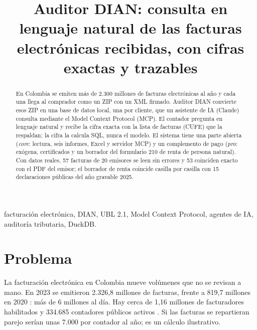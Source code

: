 \documentclass[conference,a4paper]{IEEEtran}
\begin{document}
\title{Auditor DIAN: consulta en lenguaje natural de las facturas electrónicas recibidas, con cifras exactas y trazables}

\author{
}

\maketitle

\begin{abstract}
En Colombia se emiten más de 2.300 millones de facturas electrónicas al año y cada una llega al comprador como un ZIP con un XML firmado. Auditor DIAN convierte esos ZIP en una base de datos local, una por cliente, que un asistente de IA (Claude) consulta mediante el Model Context Protocol (MCP). El contador pregunta en lenguaje natural y recibe la cifra exacta con la lista de facturas (CUFE) que la respaldan; la cifra la calcula SQL, nunca el modelo. El sistema tiene una parte abierta (\emph{core}: lectura, seis informes, Excel y servidor MCP) y un complemento de pago (\emph{pro}: exógena, certificados y un borrador del formulario 210 de renta de persona natural). Con datos reales, 57 facturas de 20 emisores se leen sin errores y 53 coinciden exacto con el PDF del emisor; el borrador de renta coincide casilla por casilla con 15 declaraciones públicas del año gravable 2025.
\end{abstract}

\begin{IEEEkeywords}
facturación electrónica, DIAN, UBL 2.1, Model Context Protocol, agentes de IA, auditoría tributaria, DuckDB.
\end{IEEEkeywords}

\section{Problema}

La facturación electrónica en Colombia mueve volúmenes que no se revisan a mano. En 2023 se emitieron 2.326,8 millones de facturas, frente a 819,7 millones en 2020 \cite{actualicese2024}: más de 6 millones al día. Hay cerca de 1,16 millones de facturadores habilitados \cite{dian021} y 334.685 contadores públicos activos \cite{incp2025}. Si las facturas se repartieran parejo serían unas 7.000 por contador al año; es un cálculo ilustrativo.
\end{document}

